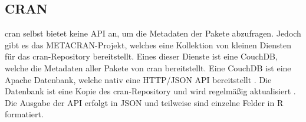\subsection{CRAN}
\label{subsec:cran}
\gls{cran} selbst bietet keine API an, um die Metadaten der Pakete abzufragen.
Jedoch gibt es das METACRAN-Projekt, welches eine Kollektion von kleinen Diensten für das \gls{cran}-Repository bereitstellt.
Eines dieser Dienste ist eine CouchDB, welche die Metadaten aller Pakete von \gls{cran} bereitstellt.
Eine CouchDB ist eine Apache Datenbank, welche nativ eine HTTP/JSON API bereitstellt \autocite{the_apache_software_foundation_apache_2024}.
Die Datenbank ist eine Kopie des \gls{cran}-Repository und wird regelmäßig aktualisiert \autocite{csardi_pkgsearch_2023}.
Die Ausgabe der API erfolgt in JSON und teilweise sind einzelne Felder in R formatiert.
